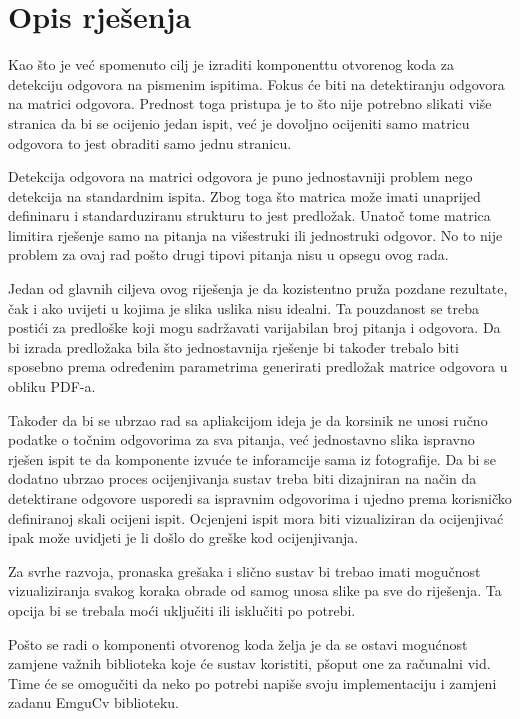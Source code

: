 \documentclass{foi}
\begin{document}
\section{Opis rješenja}

Kao što je već spomenuto cilj je izraditi komponenttu otvorenog koda za detekciju odgovora na pismenim ispitima. Fokus će biti na detektiranju odgovora na matrici odgovora. Prednost toga pristupa je to što nije potrebno slikati više stranica da bi se ocijenio jedan ispit, već je dovoljno ocijeniti samo matricu odgovora to jest obraditi samo jednu stranicu. 

Detekcija odgovora na matrici odgovora je puno jednostavniji problem nego detekcija na standardnim ispita. Zbog toga što matrica može imati unaprijed defininaru i standarduziranu strukturu to jest predložak. Unatoč tome matrica limitira rješenje samo na pitanja na višestruki ili jednostruki odgovor. No to nije problem za ovaj rad pošto drugi tipovi pitanja nisu u opsegu ovog rada.

Jedan od glavnih ciljeva ovog riješenja je da kozistentno pruža pozdane rezultate, čak i ako uvijeti u kojima je slika uslika nisu idealni. Ta pouzdanost se treba postići za predloške koji mogu sadržavati varijabilan broj pitanja i odgovora. Da bi izrada predložaka bila što jednostavnija rješenje bi također trebalo biti sposebno prema određenim parametrima generirati predložak matrice odgovora u obliku PDF-a. 

Također da bi se ubrzao rad sa apliakcijom ideja je da korsinik ne unosi ručno podatke o točnim odgovorima za sva pitanja, već jednostavno slika ispravno rješen ispit te da komponente izvuće te inforamcije sama iz fotografije. Da bi se dodatno ubrzao proces ocijenjivanja sustav treba biti dizajniran na način da detektirane odgovore usporedi sa ispravnim odgovorima i ujedno prema korisničko definiranoj skali ocijeni ispit. Ocjenjeni ispit mora biti vizualiziran da ocijenjivać ipak može uvidjeti je li došlo do greške kod ocijenjivanja.

Za svrhe razvoja, pronaska grešaka i slično sustav bi trebao imati mogučnost vizualiziranja svakog koraka obrade od samog unosa slike pa sve do riješenja. Ta opcija bi se trebala moći uključiti ili isklučiti po potrebi. 

Pošto se radi o komponenti otvorenog koda želja je da se ostavi mogućnost zamjene važnih biblioteka koje će sustav koristiti, pšoput one za računalni vid. Time će se omogučiti da neko po potrebi napiše svoju implementaciju i zamjeni zadanu EmguCv biblioteku.
\end{document}
